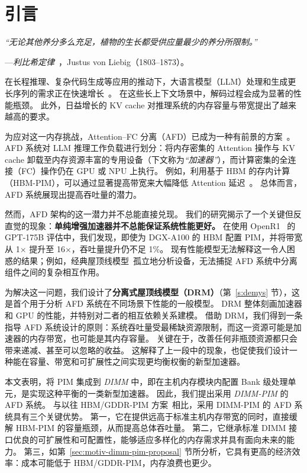 \section{引言}
\label{sec:intro}

\emph{“无论其他养分多么充足，植物的生长都受供应量最少的养分所限制。”}
\begin{flushright}
  ---\emph{利比希定律}~\cite{liebigslaw}，Justus von Liebig（1803--1873）。
\end{flushright}

在长程推理、复杂代码生成等应用的推动下，大语言模型（LLM）处理和生成更长序列的需求正在快速增长~\cite{deepseekai2025deepseekr1,plaat2024reasoning,huang2023reasoning,zhou2024survey,zhong2024evaluation,grattafiori2024llama3}。
在这些长上下文场景中，解码过程会成为显著的性能瓶颈。
此外，日益增长的 KV cache 对推理系统的内存容量与带宽提出了越来越高的要求。

为应对这一内存挑战，Attention--FC 分离（AFD）已成为一种有前景的方案~\cite{step3blog,step3system,heo2024neupims,park2024attacc,he2025papi,jiang2024neo,zhu2025megascaleinfer}。
AFD 系统对 LLM 推理工作负载进行划分：将内存密集的 Attention 操作与 KV cache 卸载至内存资源丰富的专用设备（下文称为\textit{“加速器”}），而计算密集的全连接（FC）操作仍在 GPU 或 NPU 上执行。
例如，利用基于 HBM 的存内计算（HBM-PIM），可以通过显著提高带宽来大幅降低 Attention 延迟~\cite{heo2024neupims,park2024attacc,he2025papi}。
总体而言，AFD 系统展现出提高吞吐量的潜力。

然而，AFD 架构的这一潜力并不总能直接兑现。
我们的研究揭示了一个关键但反直觉的现象：\textbf{单纯增强加速器并不总能保证系统性能更好。}
在使用 OpenR1~\cite{open-r1} 的 GPT-175B 评估中，我们发现，即使为 DGX-A100 的 HBM 配置 PIM，并将带宽从 1$\times$ 提升至 16$\times$，吞吐量提升仍不足 1\%。
现有性能模型无法解释这一令人困惑的结果；例如，经典屋顶线模型~\cite{roofline}孤立地分析设备，无法捕捉 AFD 系统中分离组件之间的复杂相互作用。

为解决这一问题，我们设计了\textbf{分离式屋顶线模型（DRM）}（第~\ref{s:demys} 节），这是首个用于分析 AFD 系统在不同场景下性能的一般模型。
DRM 整体刻画加速器和 GPU 的性能，并特别对二者的相互依赖关系建模。
借助 DRM，我们得到一条指导 AFD 系统设计的原则：系统吞吐量受最稀缺资源限制，而这一资源可能是加速器的内存带宽，也可能是其内存容量。
关键在于，改善任何非瓶颈资源都只会带来递减、甚至可以忽略的收益。
这解释了上一段中的现象，也促使我们设计一种能在容量、带宽和可扩展性之间实现更均衡权衡的新型加速器。

本文表明，将 PIM 集成到 \textit{DIMM} 中，即在主机内存模块内配置 Bank 级处理单元，是实现这种平衡的一类新型加速器。
因此，我们提出采用 \textit{DIMM-PIM} 的 AFD 系统。
与以往 HBM/GDDR-PIM 方案~\cite{heo2024neupims,park2024attacc,he2025papi,gu2025cent}相比，采用 DIMM-PIM 的 AFD 系统具有三个关键优势。
第一，它在提供远高于标准主机内存带宽的同时，直接缓解 HBM-PIM 的容量瓶颈，从而提高总体吞吐量。
第二，它继承标准 DIMM 接口优良的可扩展性和可配置性，能够适应多样化的内存需求并具有面向未来的能力。
第三，如第~\ref{sec:motiv-dimm-pim-proposal} 节所分析，它具有更高的经济效率：成本可能低于 HBM/GDDR-PIM，内存浪费也更少。

